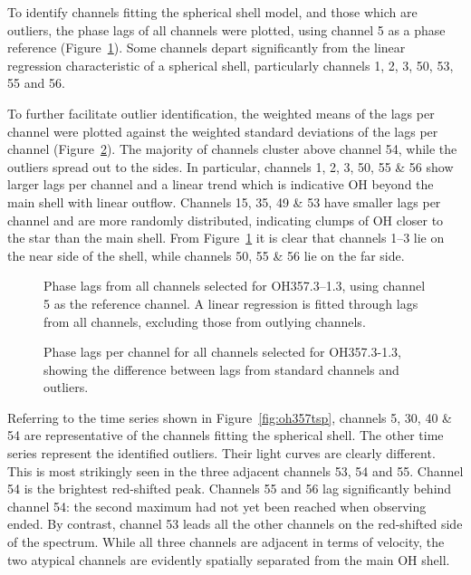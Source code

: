 \documentclass[usenatbib,usegraphicx]{mn2e}
\begin{document}
To identify channels fitting the spherical shell model, and those which are
outliers, the phase lags of all channels were plotted, using channel 5 as a
phase reference (Figure~\ref{fig:oh357l5s}). Some channels depart
significantly from the linear regression characteristic of a spherical
shell, particularly channels 1, 2, 3, 50, 53, 55 and 56.

To further facilitate outlier identification, the weighted means of the lags
per channel were plotted against the weighted standard deviations of the
lags per channel (Figure~\ref{fig:oh357acn}).  The majority of channels
cluster above channel 54, while the outliers spread out to the sides.  In
particular, channels 1, 2, 3, 50, 55 \& 56 show larger lags per channel and
a linear trend which is indicative OH beyond the main shell with linear
outflow.  Channels 15, 35, 49 \& 53 have smaller lags per channel and are
more randomly distributed, indicating clumps of OH closer to the star than
the main shell.  From Figure~\ref{fig:oh357l5s} it is clear that channels
1--3 lie on the near side of the shell, while channels 50, 55 \& 56 lie on
the far side.


\begin{figure}
\resizebox{\hsize}{!}{\texttt{[image: oh357l5s.ps]}}
\caption{Phase lags from all channels selected for OH357.3--1.3, using
channel 5 as the reference channel.  A linear regression is fitted through
lags from all channels, excluding those from outlying channels.}
\label{fig:oh357l5s}
\end{figure}

\begin{figure}
\caption{Phase lags per channel for all channels selected for OH357.3-1.3,
showing the difference between lags from standard channels and outliers.}
\label{fig:oh357acn}
\end{figure}


Referring to the time series shown in Figure~\ref{fig:oh357tsp}, channels 5,
30, 40 \& 54 are representative of the channels fitting the spherical shell.
The other time series represent the identified outliers.  Their light curves
are clearly different. This is most strikingly seen in the three adjacent
channels 53, 54 and 55. Channel 54 is the brightest red-shifted peak. 
Channels 55 and 56 lag significantly behind channel 54: the second maximum
had not yet been reached when observing ended.  By contrast, channel 53
leads all the other channels on the red-shifted side of the spectrum. While
all three channels are adjacent in terms of velocity, the two atypical
channels are evidently spatially separated from the main OH shell.
\end{document}
